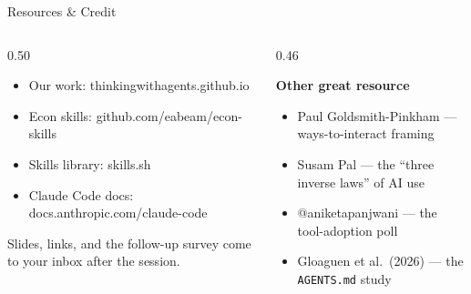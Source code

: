 \documentclass[aspectratio=169, 10pt]{beamer}
\begin{document}
\begin{frame}[fragile]{Resources \& Credit}
\vskip2pt
\begin{columns}[T]
\begin{column}{0.50\textwidth}
\begin{tcolorbox}[keybox, title={\faLink\quad Go deeper}, top=3pt, bottom=3pt]
\small
\begin{itemize}\setlength{\itemsep}{2pt}
  \item Our work: {\scriptsize\ttfamily thinkingwithagents.github.io}
  \item Econ skills: {\scriptsize\ttfamily github.com/eabeam/econ-skills}
  \item Skills library: {\scriptsize\ttfamily skills.sh}
  \item Claude Code docs: {\scriptsize\ttfamily docs.anthropic.com/claude-code}
\end{itemize}
\end{tcolorbox}
\vskip3pt
\begin{tcolorbox}[accentbox, top=2pt, bottom=2pt]
\scriptsize Slides, links, and the follow-up survey come to your inbox after the session.
\end{tcolorbox}
\end{column}
\begin{column}{0.46\textwidth}
\begin{tcolorbox}[colback=PaleSage, colframe=SlateTeal!40, boxrule=0.5pt, left=5pt, right=5pt, top=3pt, bottom=3pt]
\scriptsize
\textbf{Other great resource}
\begin{itemize}\setlength{\itemsep}{1pt}
  \item Paul Goldsmith-Pinkham --- ways-to-interact framing
  \item Susam Pal --- the ``three inverse laws'' of AI use
  \item @aniketapanjwani --- the tool-adoption poll
  \item Gloaguen et al.\ (2026) --- the \texttt{AGENTS.md} study
\end{itemize}
\end{tcolorbox}
\end{column}
\end{columns}
\end{frame}
\end{document}
